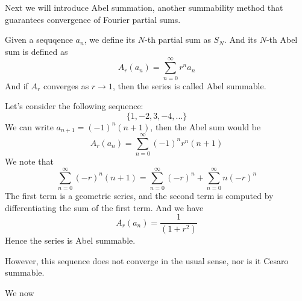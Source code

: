 Next we will introduce Abel summation, another summability method that guarantees convergence of Fourier partial sums.
\begin{definition}
    Given a sequqence $a_n$, we define its $N$-th partial sum as $S_N$. And its $N$-th Abel sum is defined as
    \begin{equation*}
        A_r(a_n)=\sum_{n=0}^\infty r^na_n
    \end{equation*}
    And if $A_r$ converges as $r\to 1$, then the series is called Abel summable.
\end{definition}
\begin{example}
    Let's consider the following sequence: 
    \begin{equation*}
        \{1, -2, 3, -4, ...\}
    \end{equation*}
    We can write $a_{n+1}=(-1)^n(n+1)$, then the Abel sum would be
    \begin{equation*}
        A_r(a_n)=\sum_{n=0}^\infty(-1)^nr^n(n+1)
    \end{equation*}
    We note that
    \begin{equation*}
        \sum_{n=0}^\infty(-r)^n(n+1)=\sum_{n=0}^\infty(-r)^n+\sum_{n=0}^\infty n(-r)^n
    \end{equation*}
    The first term is a geometric series, and the second term is computed by differentiating the sum of the first term. And we have
    \begin{equation*}
        A_r(a_n)=\frac{1}{(1+r^2)}
    \end{equation*}
    Hence the series is Abel summable.
\end{example}
However, this sequence does not converge in the usual sense, nor is it Cesaro summable.

We now 